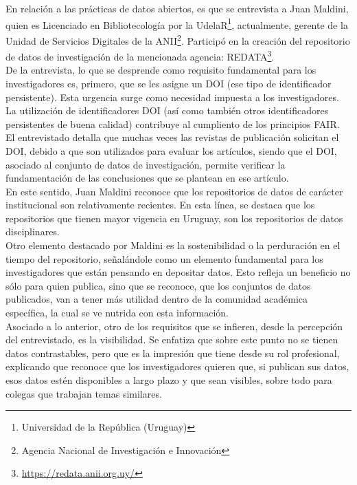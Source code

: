 \documentclass{article}
\begin{document}
En relación a las prácticas de datos abiertos, es que se entrevista a Juan Maldini, quien es Licenciado en Bibliotecología por la UdelaR\footnote{Universidad de la República (Uruguay)}, actualmente, gerente de la Unidad de Servicios Digitales de la ANII\footnote{Agencia Nacional de Investigación e Innovación}. Participó en la creación del repositorio de datos de investigación de la mencionada agencia: REDATA\footnote{\url{https://redata.anii.org.uy/}}.\\

De la entrevista, lo que se desprende como requisito fundamental para los investigadores es, primero, que se les asigne un DOI (ese tipo de identificador persistente). Esta urgencia surge como necesidad impuesta a los investigadores.\\

La utilización de identificadores DOI (así como también otros identificadores persistentes de buena calidad) contribuye al cumpliento de los principios FAIR.\\

El entrevistado detalla que muchas veces las revistas de publicación solicitan el DOI, debido a que son utilizados para evaluar los artículos, siendo que el DOI, asociado al conjunto de datos de investigación, permite verificar la fundamentación de las conclusiones que se plantean en ese artículo.\\

En este sentido, Juan Maldini reconoce que los repositorios de datos de carácter institucional son relativamente recientes. En esta línea, se destaca que los repositorios que tienen mayor vigencia en Uruguay, son los repositorios de datos disciplinares.\\

Otro elemento destacado por Maldini es la sostenibilidad o la perduración en el tiempo del repositorio, señalándole como un elemento fundamental para los investigadores que están pensando en depositar datos. Esto refleja un beneficio no sólo para quien publica, sino que se reconoce, que los conjuntos de datos publicados, van a tener más utilidad dentro de la comunidad académica específica, la cual se ve nutrida con esta información.\\

Asociado a lo anterior, otro de los requisitos que se infieren, desde la percepción del entrevistado, es la visibilidad. Se enfatiza que sobre este punto no se tienen datos contrastables, pero que es la impresión que tiene desde su rol profesional, explicando que reconoce que los investigadores quieren que, si publican sus datos, esos datos estén disponibles a largo plazo y que sean visibles, sobre todo para colegas que trabajan temas similares.\\
\end{document}
